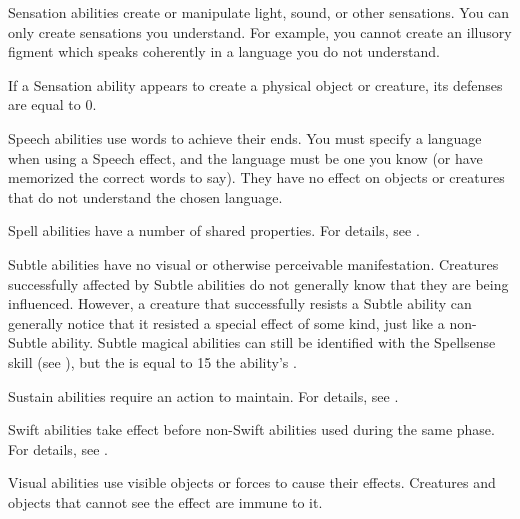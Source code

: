  Sensation abilities create or manipulate light, sound, or other sensations.
You can only create sensations you understand.
For example, you cannot create an illusory figment which speaks coherently in a language you do not understand.
\par If a Sensation ability appears to create a physical object or creature, its defenses are equal to 0.

 Speech abilities use words to achieve their ends.
You must specify a language when using a Speech effect, and the language must be one you know (or have memorized the correct words to say). They have no effect on objects or creatures that do not understand the chosen language.

 Spell abilities have a number of shared properties.
For details, see .

 Subtle abilities have no visual or otherwise perceivable manifestation.
Creatures successfully affected by Subtle abilities do not generally know that they are being influenced.
However, a creature that successfully resists a Subtle ability can generally notice that it resisted a special effect of some kind, just like a non-Subtle ability.
Subtle magical abilities can still be identified with the Spellsense skill (see ), but the  is equal to 15 \add the ability's .

 Sustain abilities require an action to maintain. For details, see .

 Swift abilities take effect before non-Swift abilities used during the same phase.
For details, see .

 Visual abilities use visible objects or forces to cause their effects.
Creatures and objects that cannot see the effect are immune to it.
